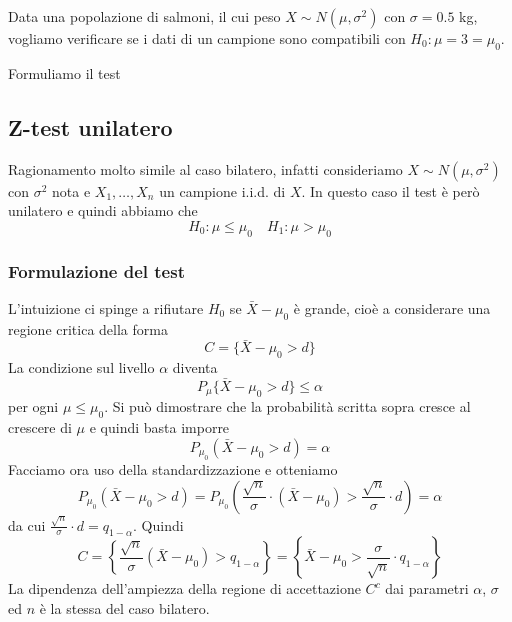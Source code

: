 \begin{example}
	Data una popolazione di salmoni, il cui peso $X \sim N(\mu, \sigma^2)$ con $\sigma = 0.5$ kg,
	vogliamo verificare se i dati di un campione sono compatibili con $H_0 \colon \mu = 3 = \mu_0$.

	Formuliamo il test
\end{example}

\subsection{Z-test unilatero}
Ragionamento molto simile al caso bilatero, infatti consideriamo $X \sim N(\mu, \sigma^2)$ con
$\sigma^2$ nota e $X_1, \dots, X_n$ un campione i.i.d. di $X$. In questo caso il test è però
unilatero e quindi abbiamo che
\[ H_0: \mu \leq \mu_0 \quad H_1: \mu > \mu_0 \]

\subsubsection{Formulazione del test}
L'intuizione ci spinge a rifiutare $H_0$ se $\bar{X} - \mu_0$ è grande, cioè a considerare
una regione critica della forma
\[ C = \{ \bar{X} - \mu_0 > d \} \]
La condizione sul livello $\alpha$ diventa
\[ P_\mu \{ \bar{X} - \mu_0 > d \} \leq \alpha \]
per ogni $\mu \leq \mu_0$. Si può dimostrare che la probabilità scritta sopra cresce al crescere
di $\mu$ e quindi basta imporre
\[ P_{\mu_0} (\bar{X} - \mu_0 > d) = \alpha \]
Facciamo ora uso della standardizzazione e otteniamo
\[
	P_{\mu_0} (\bar{X} - \mu_0 > d) =
	P_{\mu_0} \left( \frac{\sqrt{n}}{\sigma} \cdot (\bar{X} - \mu_0) >
	\frac{\sqrt{n}}{\sigma} \cdot d \right) = \alpha
\]
da cui $\frac{\sqrt{n}}{\sigma} \cdot d = q_{1-\alpha}$. Quindi
\[
	C = \left\{ \frac{\sqrt{n}}{\sigma} (\bar{X} - \mu_0) > q_{1-\alpha} \right\}
	= \left\{ \bar{X} - \mu_0 > \frac{\sigma}{\sqrt{n}} \cdot q_{1-\alpha} \right\}
\]
La dipendenza dell'ampiezza della regione di accettazione $C^c$ dai parametri $\alpha$, $\sigma$
ed $n$ è la stessa del caso bilatero.

